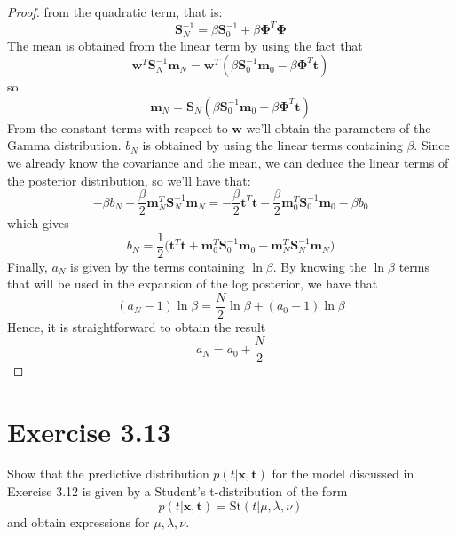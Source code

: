 \begin{proof}
    from the quadratic term, that is:
     \[
         \mathbf{S}_N^{-1} = \beta \mathbf{S}_0^{-1} + \beta \mathbf{\Phi}^T\mathbf{\Phi}
    \] 
    The mean is obtained from the linear term by using the fact that
    \[
        \mathbf{w}^T \mathbf{S}_N^{-1} \mathbf{m}_N
        = \mathbf{w}^T(\beta \mathbf{S}_0^{-1} \mathbf{m}_0 - \beta \mathbf{\Phi}^T \mathbf{t})
    \] 
    so 
    \[
        \mathbf{m}_N = \mathbf{S}_N 
            (\beta \mathbf{S}_0^{-1} \mathbf{m}_0 - \beta \mathbf{\Phi}^T \mathbf{t})
    \] 
    From the constant terms with respect to $\mathbf{w}$ we'll obtain the
    parameters of the Gamma distribution. $b_N$ is obtained by using the 
    linear terms containing  $\beta$. Since we already know the covariance and the 
    mean, we can deduce the linear terms of the posterior distribution, so we'll have
    that:
    \[
        - \beta b_N
        -\frac{\beta}{2} \mathbf{m}_N^T \mathbf{S}_N^{-1} \mathbf{m}_N
        = -\frac{\beta}{2} \mathbf{t}^T\mathbf{t} 
        -\frac{\beta}{2} \mathbf{m}_0^T \mathbf{S}_0^{-1} \mathbf{m}_0
        -\beta b_0
    \]
    which gives
    \[
        b_N 
        = \frac{1}{2} \big(
            \mathbf{t}^T\mathbf{t} + \mathbf{m}_0^T\mathbf{S}_0^{-1}\mathbf{m}_0
            - \mathbf{m}_N^T\mathbf{S}_N^{-1}\mathbf{m}_N\big)
    \] 
    Finally, $a_N$ is given by the terms containing $\ln \beta$. 
    By knowing the $\ln \beta$ terms that will be used in the expansion of the 
    log posterior, we have that
    \[
        (a_N - 1) \ln \beta = \frac{N}{2} \ln \beta + (a_0 - 1) \ln \beta
    \] 
    Hence, it is straightforward to obtain the result
    \[
        a_N = a_0 + \frac{N}{2}
    \] 
\end{proof}

\section*{Exercise 3.13}
Show that the predictive distribution $p(t | \mathbf{x}, \mathbf{t})$ for the 
model discussed in Exercise 3.12 is given by a Student's t-distribution of
the form
\begin{equation}\label{eq:3.114}\tag{3.114}
    p(t | \mathbf{x}, \mathbf{t}) = \text{St}(t | \mu, \lambda, \nu)
\end{equation}
and obtain expressions for $\mu, \lambda, \nu$.

\vspace{1em}

